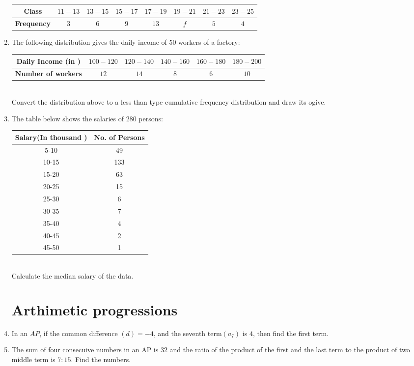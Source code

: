 \documentclass{article}
\begin{document}
\begin{enumerate}
	\begin{tabular}{|c|c|c|c|c|c|c|c|}
\hline
	\textbf{Class} & $11-13$ & $13-15$ & $15-17$ & $17-19$ & $19-21$ & $21-23$ & $23-25$ \\
\hline
	\textbf{Frequency} & $3$ & $6$ & $9$ & $13$ & $f$ & $5$ & $4$ \\
\hline
\end{tabular}
\item The following distribution gives the daily income of $50$ workers of a factory:\\

	\begin{tabular}{|c|c|c|c|c|c|}
		\hline
		\textbf{Daily Income (in  \rupee )} & $100-120$ & $120-140$ & $140-160$ & $160-180$ & $180-200$\\
\hline
		\textbf{Number of workers} & $12$ & $14$ &$8$ & $6$ & $10$\\
		\hline
	\end{tabular}\\

	Convert the distribution above to a less than type cumulative frequency distribution and draw its ogive.
		\item The table below shows the salaries of $280$ persons:\\

			\begin{tabular}{|c|c|}
				\hline
				\textbf{Salary(In thousand  \rupee )} & \textbf{No. of Persons}\\
				\hline
				5-10 & 49 \\
				\hline
				10-15 & 133 \\ 
				\hline
				15-20 & 63 \\
				\hline
				20-25 & 15 \\
				\hline
				25-30 & 6 \\
				\hline
				30-35 & 7 \\
				\hline
				35-40 & 4 \\
				\hline
				40-45 & 2 \\
				\hline
				45-50 & 1 \\
				\hline
			\end{tabular}\\

			Calculate the median salary of the data.
			\section{Arthimetic progressions}
			\item In an $AP$, if the common difference $(d) = -4$, and the seventh term$(a_7)$ is $4$, then find the first term.		
			\item The sum of four consecuive numbers in an AP is $32$ and the ratio of the product of the first and the last term to the product of two middle term is $7:15$. Find the numbers.

\end{enumerate}
\end{document}
